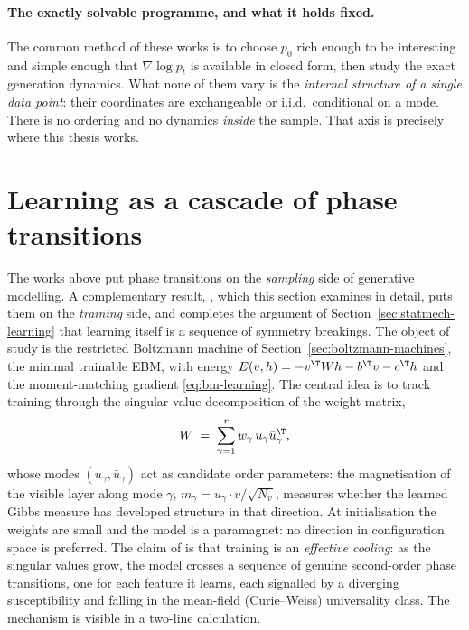 \paragraph{The exactly solvable programme, and what it holds fixed.} The
common method of these works is to choose $p_0$ rich enough to be
interesting and simple enough that $\nabla \log p_t$ is available in
closed form, then study the exact generation dynamics. What none of them
vary is the \emph{internal structure of a single data point}: their
coordinates are exchangeable or i.i.d.\ conditional on a mode. There is
no ordering and no dynamics \emph{inside} the sample. That axis is
precisely where this thesis works.

\section{Learning as a cascade of phase transitions}\label{sec:cascade}

The works above put phase transitions on the \emph{sampling} side of
generative modelling. A complementary result, \citet{bachtis2024cascade},
which this section examines in detail, puts them on the \emph{training}
side, and completes the argument of Section~\ref{sec:statmech-learning}
that learning itself is a sequence of symmetry breakings. The object of
study is the restricted Boltzmann machine of
Section~\ref{sec:boltzmann-machines}, the minimal trainable EBM, with
energy $E(v, h) = -v^\T W h - b^\T v - c^\T h$ and the moment-matching
gradient \eqref{eq:bm-learning}. The central idea is to track training
through the singular value decomposition of the weight matrix,
\begin{equation}
  W \;=\; \sum_{\gamma=1}^{r} w_\gamma\, u_\gamma \bar u_\gamma^\T ,
  \label{eq:rbm-svd}
\end{equation}
whose modes $(u_\gamma, \bar u_\gamma)$ act as candidate order
parameters: the magnetisation of the visible layer along mode $\gamma$,
$m_\gamma = u_\gamma \cdot v / \sqrt{N_v}$, measures whether the learned
Gibbs measure has developed structure in that direction. At
initialisation the weights are small and the model is a paramagnet: no
direction in configuration space is preferred. The claim of
\citet{bachtis2024cascade} is that training is an \emph{effective
cooling}: as the singular values grow, the model crosses a sequence of
genuine second-order phase transitions, one for each feature it learns,
each signalled by a diverging susceptibility and falling in the
mean-field (Curie--Weiss) universality class. The mechanism is visible in
a two-line calculation.

